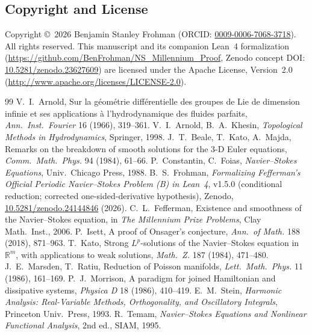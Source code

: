 \documentclass[11pt,a4paper]{article}
\theoremstyle{plain}
\theoremstyle{definition}
\theoremstyle{remark}
\begin{document}
\subsection*{Copyright and License}
Copyright \copyright\ 2026 Benjamin Stanley Frohman (ORCID: \href{https://orcid.org/0009-0006-7068-3718}{0009-0006-7068-3718}). All rights reserved. This manuscript and its companion Lean~4 formalization (\url{https://github.com/BenFrohman/NS_Millennium_Proof}, Zenodo concept DOI: \href{https://doi.org/10.5281/zenodo.23627609}{10.5281/zenodo.23627609}) are licensed under the Apache License, Version~2.0 (\url{http://www.apache.org/licenses/LICENSE-2.0}).

\begin{thebibliography}{99}
 V.~I.~Arnold, Sur la g\'eom\'etrie diff\'erentielle des groupes de Lie de dimension infinie et ses applications \`a l'hydrodynamique des fluides parfaits, \emph{Ann.\ Inst.\ Fourier} 16 (1966), 319--361.
 V.~I.~Arnold, B.~A.~Khesin, \emph{Topological Methods in Hydrodynamics}, Springer, 1998.
 J.~T.~Beale, T.~Kato, A.~Majda, Remarks on the breakdown of smooth solutions for the 3-D Euler equations, \emph{Comm.\ Math.\ Phys.} 94 (1984), 61--66.
 P.~Constantin, C.~Foias, \emph{Navier--Stokes Equations}, Univ.\ Chicago Press, 1988.
 B.~S.~Frohman, \emph{Formalizing Fefferman's Official Periodic Navier--Stokes Problem (B) in Lean~4}, v1.5.0 (conditional reduction; corrected one-sided-derivative hypothesis), Zenodo, \href{https://doi.org/10.5281/zenodo.24144846}{10.5281/zenodo.24144846} (2026).
 C.~L.~Fefferman, Existence and smoothness of the Navier--Stokes equation, in \emph{The Millennium Prize Problems}, Clay Math.\ Inst., 2006.
 P.~Isett, A proof of Onsager's conjecture, \emph{Ann.\ of Math.} 188 (2018), 871--963.
 T.~Kato, Strong $L^p$-solutions of the Navier--Stokes equation in $\mathbb R^m$, with applications to weak solutions, \emph{Math.\ Z.} 187 (1984), 471--480.
 J.~E.~Marsden, T.~Ratiu, Reduction of Poisson manifolds, \emph{Lett.\ Math.\ Phys.} 11 (1986), 161--169.
 P.~J.~Morrison, A paradigm for joined Hamiltonian and dissipative systems, \emph{Physica D} 18 (1986), 410--419.
 E.~M.~Stein, \emph{Harmonic Analysis: Real-Variable Methods, Orthogonality, and Oscillatory Integrals}, Princeton Univ.\ Press, 1993.
 R.~Temam, \emph{Navier--Stokes Equations and Nonlinear Functional Analysis}, 2nd ed., SIAM, 1995.
\end{thebibliography}
\end{document}
